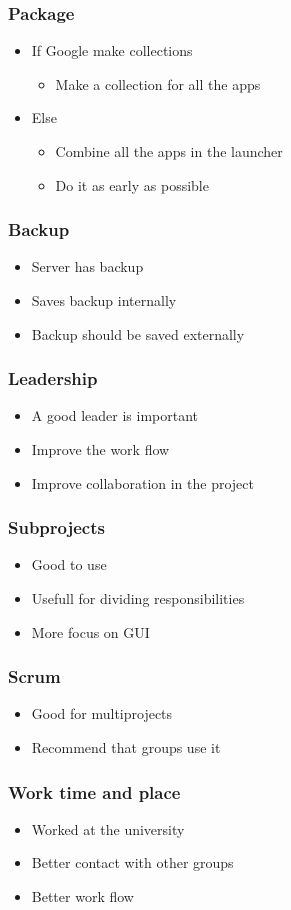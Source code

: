 \begin{frame}
	\frametitle{Package}
	\begin{itemize}
		\item If Google make collections
			\begin{itemize}
				\item Make a collection for all the apps
			\end{itemize}
		\item Else
			\begin{itemize}
				\item Combine all the apps in the launcher
				\item Do it as early as possible
			\end{itemize}
	\end{itemize}
\end{frame}

\begin{frame}
	\frametitle{Backup}
	\begin{itemize}
		\item Server has backup
		\item Saves backup internally
		\item Backup should be saved externally
	\end{itemize}
\end{frame}

\begin{frame}
	\frametitle{Leadership}
	\begin{itemize}
		\item A good leader is important
		\item Improve the work flow
		\item Improve collaboration in the project
	\end{itemize}
\end{frame}

\begin{frame}
	\frametitle{Subprojects}
	\begin{itemize}
		\item Good to use
		\item Usefull for dividing responsibilities
		\item More focus on GUI
	\end{itemize}
\end{frame}

\begin{frame}
	\frametitle{Scrum}
	\begin{itemize}
		\item Good for multiprojects
		\item Recommend that groups use it
	\end{itemize}
\end{frame}

\begin{frame}
	\frametitle{Work time and place}
	\begin{itemize}
		\item Worked at the university
		\item Better contact with other groups
		\item Better work flow
	\end{itemize}
\end{frame}
